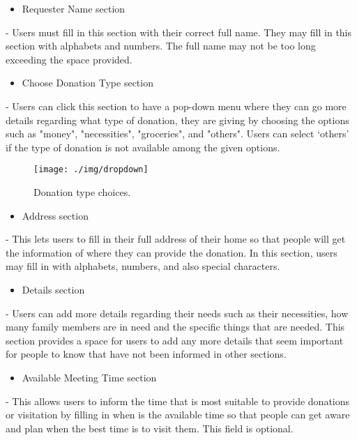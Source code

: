 \documentclass[conference]{IEEEtran}
\begin{document}
\begin{itemize}
\item Requester Name section
\end{itemize}
-  Users must fill in this section with their correct full name. They may fill in this section with alphabets and numbers. The full name may not be too long exceeding the space provided.\\

\begin{itemize}
\item Choose Donation Type section
\end{itemize}
- Users can click this section to have a pop-down menu where they can go more details regarding what type of donation, they are giving by choosing the options such as "money", "necessities", "groceries", and "others". Users can select ‘others’ if the type of donation is not available among the given options. \\

\begin{figure}[h!]
\texttt{[image: ./img/dropdown]}
\centering
\caption{Donation type choices.}
\end{figure}

\begin{itemize}
\item Address section
\end{itemize}
- This lets users to fill in their full address of their home so that people will get the information of where they can provide the donation. In this section, users may fill in with alphabets, numbers, and also special characters. \\
 
\begin{itemize}
\item Details  section
\end{itemize}
- Users can add more details regarding their needs such as their necessities, how many family members are in need and the specific things that are needed. This section provides a space for users to add any more details that seem important for people to know that have not been informed in other sections. \\

\begin{itemize}
\item Available Meeting Time section
\end{itemize}
- This allows users to inform the time that is most suitable to provide donations or visitation by filling in when is the available time so that people can get aware and plan when the best time is to visit them. This field is optional.\\
\end{document}
